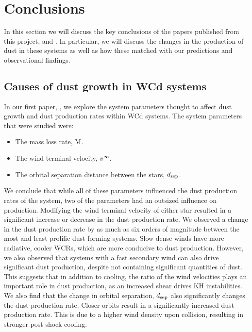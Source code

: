 \section{Conclusions}

In this section we will discuss the key conclusions of the papers published from this project, \emph{\firstpapertitle{}} and \emph{\secondpapertitle}.
In particular, we will discuss the changes in the production of dust in these systems as well as how these matched with our predictions and observational findings.

\subsection{Causes of dust growth in WCd systems}

In our first paper, \emph{\firstpapertitle}, we explore the system parameters thought to affect dust growth and dust production rates within WCd systems.
The system parameters that were studied were:

\begin{itemize}
  \item The mass loss rate, $\dot{\text{M}}$.
  \item The wind terminal velocity, $v^\infty$.
  \item The orbital separation distance between the stars, $d_\text{sep}$.
\end{itemize}

\noindent
We conclude that while all of these parameters influenced the dust production rates of the system, two of the parameters had an outsized influence on production.
Modifying the wind terminal velocity of either star resulted in a significant increase or decrease in the dust production rate.
We observed a change in the dust production rate by as much as six orders of magnitude between the most and least prolific dust forming systems.
Slow dense winds have more radiative, cooler WCRs, which are more conducive to dust production.
However, we also observed that systems with a fast secondary wind can also drive significant dust production, despite not containing significant quantities of dust.
This suggests that in addition to cooling, the ratio of the wind velocities plays an important role in dust production, as an increased shear drives KH instabilities.
We also find that the change in orbital separation, $d_\text{sep}$ also significantly changes the dust production rate.
Closer orbits result in a significantly increased dust production rate.
This is due to a higher wind density upon collision, resulting in stronger post-shock cooling.

